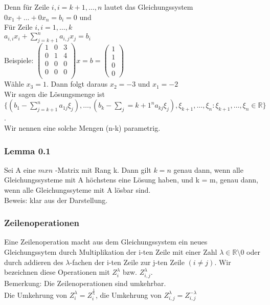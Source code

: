 \documentclass{scrartcl}
\newcommand{\lb}{\lambda}
\newcommand{\mlb}{\(\lb\)}
\newcommand{\R}{\mathbb{R}}
\begin{document}
Denn f\"ur Zeile \(i, i=k+1, \dots, n\) lautet das Gleichungssystem \(0x_1 + \dots + 0x_n = b_i = 0\) und \\
F\"ur Zeile \(i, i =1, \dots, k\) \\
\(a_{i, i} x_i + \sum_{j=k+1}^n a_{i,j} x_j = b_i\)\\
Beispiele:
\(
\begin{pmatrix}
1 & 0 & 3\\
0 & 1 & 4\\
0 & 0 & 0\\
0 & 0 & 0\\
\end{pmatrix} x = b = 
\begin{pmatrix}
1\\1\\0\\0
\end{pmatrix}
\)\\
W\"ahle \(x_3 = 1\). Dann folgt daraus \(x_2 = -3\) und \(x_1 = -2\)\\
Wir sagen die L\"osungsmenge ist \\
\(\{(b_1 - \sum_{j=k+1}^na_{1j}\xi_j), \dots,  (b_k - \sum_j={k+1}^na_{kj}\xi_j), \xi_{k+1}, \dots, \xi_n : \xi_{k+1}, \dots, \xi_n \in \R\}\).\\
Wir nennen eine solche Mengen (n-k) parametrig.

\subsubsection{Lemma 0.1}
Sei A eine \(mxn\) -Matrix mit Rang k. Dann gilt \(k=n\)  genau dann, wenn alle Gleichungssysteme mit A h\"ochstens eine L\"osung haben, und k = m, genau dann, wenn alle Gleichungssyteme mit A l\"osbar sind.\\
Beweis: klar aus der Darstellung.\\

\subsubsection{Zeilenoperationen}
Eine Zeilenoperation macht aus dem Gleichungssystem ein neues Gleichungssytem durch Multiplikation  der i-ten Zeile mit einer Zahl \(\lb \in \R \setminus 0\) oder durch addieren des \mlb -fachen der i-ten Zeile zur j-ten Zeile \((i \neq j)\). Wir bezeichnen diese Operationen mit \(Z_i^\lb\) bzw. \(Z_{i,j}^\lb\).\\
Bemerkung: Die Zeilenoperationen sind umkehrbar. \\
Die Umkehrung von \(Z_i^\lb = Z_i^{\frac{1}{\lb}}\), die Umkehrung von \(Z_{i,j}^\lb = Z_{i,j}^{-\lb}\)
\end{document}
